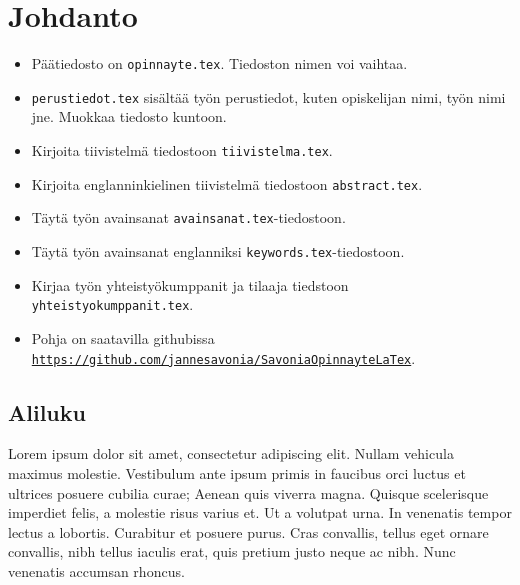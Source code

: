 


\usepackage{hyperref}





\onehalfspacing

\section{Johdanto}
\begin{itemize}
\item Päätiedosto on \texttt{opinnayte.tex}. Tiedoston nimen voi vaihtaa.
\item \texttt{perustiedot.tex} sisältää työn perustiedot, kuten opiskelijan nimi, työn nimi jne. Muokkaa tiedosto kuntoon.
\item Kirjoita tiivistelmä tiedostoon \texttt{tiivistelma.tex}.
\item Kirjoita englanninkielinen tiivistelmä tiedostoon \texttt{abstract.tex}.
\item Täytä työn avainsanat \texttt{avainsanat.tex}-tiedostoon.
\item Täytä työn avainsanat englanniksi \texttt{keywords.tex}-tiedostoon.
\item Kirjaa työn yhteistyökumppanit ja tilaaja tiedstoon \texttt{yhteistyokumppanit.tex}.
\item Pohja on saatavilla githubissa \href{https://github.com/jannesavonia/SavoniaOpinnayteLaTex}{\texttt{https://github.com/jannesavonia/SavoniaOpinnayteLaTex}}. 
\end{itemize}

\subsection{Aliluku}



Lorem ipsum dolor sit amet, consectetur adipiscing elit. Nullam vehicula maximus molestie. Vestibulum ante ipsum primis in faucibus orci luctus et ultrices posuere cubilia curae; Aenean quis viverra magna. Quisque scelerisque imperdiet felis, a molestie risus varius et. Ut a volutpat urna. In venenatis tempor lectus a lobortis. Curabitur et posuere purus. Cras convallis, tellus eget ornare convallis, nibh tellus iaculis erat, quis pretium justo neque ac nibh. Nunc venenatis accumsan rhoncus.

